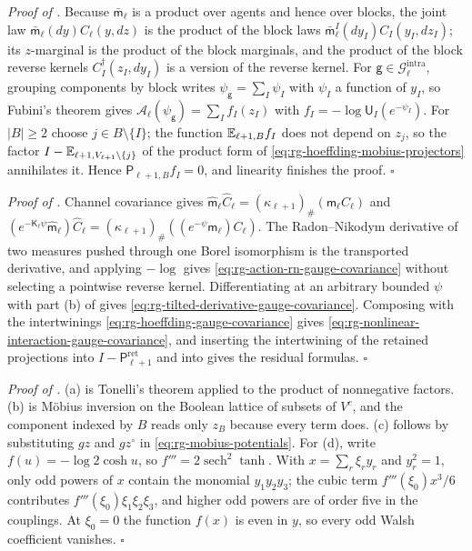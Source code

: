 \noindent\emph{Proof of .}
Because $\bar{\mathsf m}_\ell$ is a product over agents and hence over blocks, the
joint law $\bar{\mathsf m}_\ell(dy)C_\ell(y,dz)$ is the product of the block laws
$\bar{\mathsf m}_\ell^{I}(dy_I)C_I(y_I,dz_I)$; its $z$-marginal is the product of
the block marginals, and the product of the block reverse kernels
$C_I^\dagger(z_I,dy_I)$ is a version of the reverse kernel. For $\mathsf
g\in\mathcal G_\ell^{\mathrm{intra}}$, grouping components by block writes
$\psi_{\mathsf g}=\sum_I\psi_I$ with $\psi_I$ a function of $y_I$, so Fubini's
theorem gives $\mathcal A_\ell(\psi_{\mathsf g})=\sum_If_I(z_I)$ with
$f_I=-\log\mathsf U_I(e^{-\psi_I})$. For $\lvert B\rvert\ge2$ choose
$j\in B\setminus\{I\}$; the function $\mathbb E_{\ell+1,B}f_I$ does not depend on
$z_j$, so the factor $I-\mathbb E_{\ell+1,V_{\ell+1}\setminus\{j\}}$ of the product
form of \eqref{eq:rg-hoeffding-mobius-projectors} annihilates it. Hence
$\mathsf P_{\ell+1,B}f_I=0$, and linearity finishes the proof. $\square$

\noindent\emph{Proof of .}
Channel covariance gives $\widehat{\mathsf m}_\ell\widehat
C_\ell=(\kappa_{\ell+1})_\#(\mathsf m_\ell C_\ell)$ and
$(e^{-\mathsf K_\ell\psi}\widehat{\mathsf m}_\ell)\widehat
C_\ell=(\kappa_{\ell+1})_\#((e^{-\psi}\mathsf m_\ell)C_\ell)$. The Radon--Nikodym
derivative of two measures pushed through one Borel isomorphism is the transported
derivative, and applying $-\log$ gives \eqref{eq:rg-action-rn-gauge-covariance}
without selecting a pointwise reverse kernel. Differentiating at an arbitrary
bounded $\psi$ with part (b) of  gives
\eqref{eq:rg-tilted-derivative-gauge-covariance}. Composing with the intertwinings
\eqref{eq:rg-hoeffding-gauge-covariance} gives
\eqref{eq:rg-nonlinear-interaction-gauge-covariance}, and inserting the intertwining
of the retained projections into $I-\mathsf P^{\mathrm{ret}}_{\ell+1}$ and into
 gives the residual formulas. $\square$

\noindent\emph{Proof of .}
(a) is Tonelli's theorem applied to the product of nonnegative factors. (b) is
M\"obius inversion on the Boolean lattice of subsets of $V^c$, and the component
indexed by $B$ reads only $z_B$ because every term does. (c) follows by
substituting $gz$ and $gz^\circ$ in \eqref{eq:rg-mobius-potentials}. For (d), write
$f(u)=-\log2\cosh u$, so $f'''=2\operatorname{sech}^2\tanh$. With
$x=\sum_r\xi_ry_r$ and $y_r^2=1$, only odd powers of $x$ contain the monomial
$y_1y_2y_3$; the cubic term $f'''(\xi_0)x^3/6$ contributes
$f'''(\xi_0)\xi_1\xi_2\xi_3$, and higher odd powers are of order five in the
couplings. At $\xi_0=0$ the function $f(x)$ is even in $y$, so every odd Walsh
coefficient vanishes. $\square$


